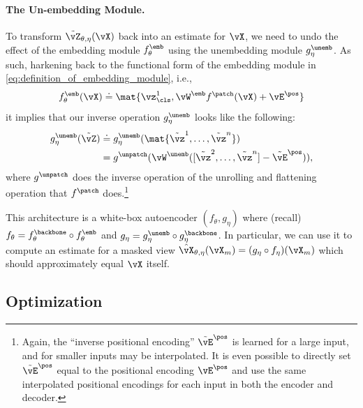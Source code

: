 \documentclass[../../book-main.tex]{subfiles}
\begin{document}
\paragraph{The Un-embedding Module.} To transform
\(\tilde{\vZ}_{\theta, \eta}(\vX)\) back into an estimate for
\(\vX\), we need to undo the effect of the embedding module
\(f_{\theta}^{\emb}\) using the unembedding module
\(g_{\eta}^{\unemb}\). As such, harkening back to the functional form
of the embedding module in \eqref{eq:definition_of_embedding_module}, i.e.,
\begin{equation}
f_{\theta}^{\emb}(\vX) \doteq \mat{\vz_{\cls}^{1},
\vW^{\emb}f^{\patch}(\vX) + \vE^{\pos}}
\end{equation}
it implies that our inverse operation \(g_{\eta}^{\unemb}\) looks
like the following:
\begin{align}
g_{\eta}^{\unemb}(\tilde{\vZ}) &\doteq
g_{\eta}^{\unemb}(\mat{\tilde{\vz}^{1}, \dots, \tilde{\vz}^{n}}) \\
&=
g^{\unpatch}(\vW^{\unemb}([\tilde{\vz}^{2}, \dots, \tilde{\vz}^{n}] -
\tilde{\vE}^{\pos})),
\end{align}
where \(g^{\unpatch}\) does the inverse operation of the unrolling
and flattening operation that \(f^{\patch}\) does.\footnote{Again,
the ``inverse positional encoding'' \(\tilde{\vE}^{\pos}\) is learned
for a large input, and for smaller inputs may be interpolated. It is
even possible to directly set \(\tilde{\vE}^{\pos}\) equal to the
positional encoding \(\vE^{\pos}\) and use the same interpolated
positional encodings for each input in both the encoder and decoder.}

This architecture is a white-box autoencoder \((f_{\theta},
g_{\eta})\) where (recall) \(f_{\theta} = f_{\theta}^{\backbone}
\circ f_{\theta}^{\emb}\) and \(g_{\eta} = g_{\eta}^{\unemb} \circ
g_{\eta}^{\backbone}\). In particular, we can use it to compute an
estimate for a masked view \(\hat{\vX}_{\theta, \eta}(\vX_{m}) =
(g_{\eta} \circ f_{\eta})(\vX_{m})\) which should approximately equal
\(\vX\) itself.

\subsection{Optimization}\label{sub:image_completion_optimization}
\end{document}
